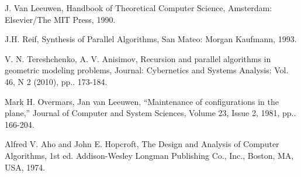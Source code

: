 \documentclass[conference]{IEEEtran}
\theoremstyle{plane}
\begin{document}
\begin{thebibliography}{00}
	 J. Van Leeuwen, Handbook of Theoretical Computer Science, Amsterdam: Elsevier/The MIT Press, 1990.
	
	 J.H. Reif, Synthesis of Parallel Algorithms, San Mateo: Morgan Kaufmann, 1993.
	
	 V. N. Tereshchenko, A. V. Anisimov, Recursion and parallel algorithms in geometric modeling problems, Journal: Cybernetics and Systems Analysis: Vol. 46, N 2 (2010), pp.. 173-184.
	
	 Mark H. Overmars, Jan van Leeuwen, ``Maintenance of configurations in the plane,'' Journal of Computer and System Sciences, Volume 23, Issue 2, 1981, pp.. 166-204.
	
	 Alfred V. Aho and John E. Hopcroft, The Design and Analysis of Computer Algorithms, 1st ed. Addison-Wesley Longman Publishing Co., Inc., Boston, MA, USA, 1974.
\end{thebibliography}
\end{document}
